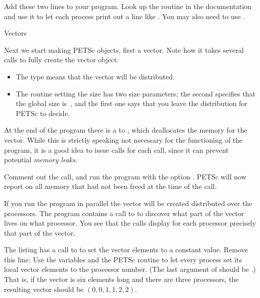 \begin{exercise}
Add these two lines to your program.
Look up the routine  in the documentation
and use it to let each process print out a line like . You may also need to use .
\end{exercise}


 {Vectors}

Next we start making PETSc objects, first a vector.
Note how it takes several calls to fully create the vector
object:
\begin{itemize}
\item The type  means that the vector will be distributed.
\item The routine setting the size has two size parameters; the second
  specifies that the global size is~, and the first one says
  that  you leave the distribution for PETSc to decide.
\end{itemize}

At the end of the program there is a to , which
deallocates the memory for the vector. While this is strictly speaking
not necessary for the functioning of the program, it is a good idea to
issue  calls for each  call, since it can prevent
potential \emph{memory leaks}.

\begin{exercise}
  Comment out the  call, and run the program with the
  option . PETSc will now report on all memory that
  had not been freed at the time of the  call.
\end{exercise}

If you run the program in parallel the vector will be created
distributed over the processors. The program contains 
a call to  to discover what part of the vector
lives on what processor. You see that the  calls display
for each processor precisely that part of the vector.

\begin{exercise}
  The listing has a call to  to set the vector elements to a
  constant value. Remove this line.
  Use the  variables and the PETSc routine
   to let every process set its
  local vector elements to the processor number. (The last argument of
   should be .) That is, if the
  vector is six elements long and there are three processors, the
  resulting vector should be $(0,0,1,1,2,2)$.
\end{exercise}

